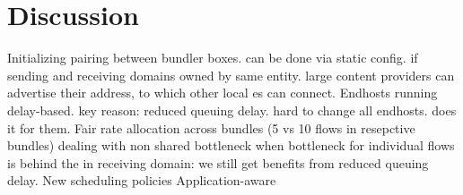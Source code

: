 \section{Discussion}\label{s:discussion}

\begin{outline}
\1 Initializing pairing between bundler boxes.
    \2 can be done via static config. if sending and receiving domains owned by same entity.
    \2 large content providers can advertise their \inbox address, to which other local {\outbox}es can connect.
\1 Endhosts running delay-based. 
    \2 key reason: reduced queuing delay. hard to change all endhosts. \name does it for them.
\1 Fair rate allocation across bundles (5 vs 10 flows in resepctive bundles) 
\1 dealing with non shared bottleneck 
\1 when bottleneck for individual flows is behind the \outbox in receiving domain: we still get benefits from reduced queuing delay. 
\1 New scheduling policies 
    \2 Application-aware 
\end{outline}
